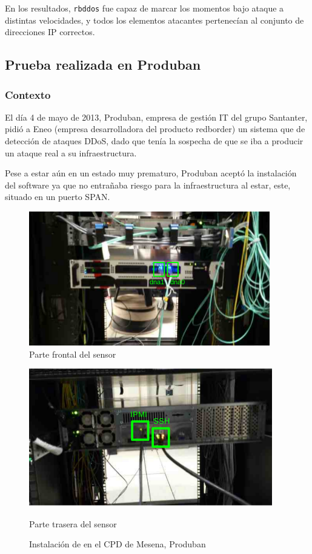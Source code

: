 En los resultados, \texttt{rbddos} fue capaz de marcar los momentos bajo ataque a distintas velocidades, y todos los 
elementos atacantes pertenecían al conjunto de direcciones IP correctos.

\subsection{Prueba realizada en Produban}
\subsubsection{Contexto}
El día 4 de mayo de 2013, Produban, empresa de gestión IT del grupo Santanter, pidió a Eneo (empresa desarrolladora del
producto redborder) un sistema que de detección
de ataques \gls{DDoS}, dado que tenía la sospecha de que se iba a producir un ataque real a su infraestructura.

Pese a estar aún en un estado muy prematuro, Produban aceptó la instalación del software ya que no entrañaba riesgo 
para la infraestructura al estar, este, situado en un puerto SPAN.

\begin{figure}[hbtp]
  \centering
  \includegraphics[width=\columnwidth]{CapituloPruebas/Figuras/ProdubanFrontal}
  \caption{Parte frontal del sensor}
  \label{fig:produban_mesena_frontal}
\end{figure}
\begin{figure}[hbtp]
  \includegraphics[width=\columnwidth]{CapituloPruebas/Figuras/ProdubanTrasera}
  \caption{Parte trasera del sensor}
  \label{fig:produban_mesena_trasera}
\caption{Instalación de \redborderddos{} en el CPD de Mesena, Produban}
\end{figure}
%

